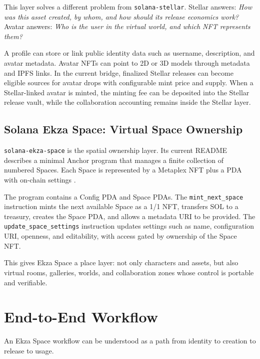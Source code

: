 \documentclass[10pt,twocolumn]{article}
\newcommand{\protocol}[1]{\texttt{#1}}
\begin{document}
This layer solves a different problem from \protocol{solana-stellar}. Stellar answers: \emph{How was this asset created, by whom, and how should its release economics work?} Avatar answers: \emph{Who is the user in the virtual world, and which NFT represents them?}

A profile can store or link public identity data such as username, description, and avatar metadata. Avatar NFTs can point to 2D or 3D models through metadata and IPFS links. In the current bridge, finalized Stellar releases can become eligible sources for avatar drops with configurable mint price and supply. When a Stellar-linked avatar is minted, the minting fee can be deposited into the Stellar release vault, while the collaboration accounting remains inside the Stellar layer.

\subsection{Solana Ekza Space: Virtual Space Ownership}
\protocol{solana-ekza-space} is the spatial ownership layer. Its current README describes a minimal Anchor program that manages a finite collection of numbered Spaces. Each Space is represented by a Metaplex NFT plus a PDA with on-chain settings \cite{solana_ekza_space}.

The program contains a Config PDA and Space PDAs. The \protocol{mint\_next\_space} instruction mints the next available Space as a 1/1 NFT, transfers SOL to a treasury, creates the Space PDA, and allows a metadata URI to be provided. The \protocol{update\_space\_settings} instruction updates settings such as name, configuration URI, openness, and editability, with access gated by ownership of the Space NFT.

This gives Ekza Space a place layer: not only characters and assets, but also virtual rooms, galleries, worlds, and collaboration zones whose control is portable and verifiable.

\section{End-to-End Workflow}
An Ekza Space workflow can be understood as a path from identity to creation to release to usage.
\end{document}
